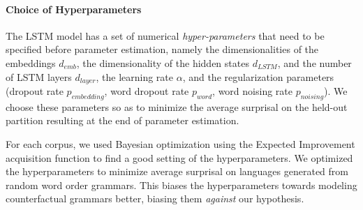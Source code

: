 \documentclass[11pt,letterpaper]{article}
\begin{document}

\paragraph{Choice of Hyperparameters}

The LSTM model has a set of numerical \emph{hyper-parameters} that need to be specified before parameter estimation, namely the dimensionalities of the embeddings $d_{emb}$, the dimensionality of the hidden states $d_{LSTM}$, and the number of LSTM layers $d_{layer}$, the learning rate $\alpha$, and the regularization parameters (dropout rate $p_{embedding}$, word dropout rate $p_{word}$, word noising rate $p_{noising}$).
We choose these parameters so as to minimize the average surprisal on the held-out partition resulting at the end of parameter estimation.

For each corpus, we used Bayesian optimization using the Expected Improvement acquisition function \citep{snoek-practical-2012} to find a good setting of the hyperparameters.
We optimized the hyperparameters to minimize average surprisal on languages generated from random word order grammars.
This biases the hyperparameters towards modeling counterfactual grammars better, biasing them \emph{against} our hypothesis.
\end{document}
